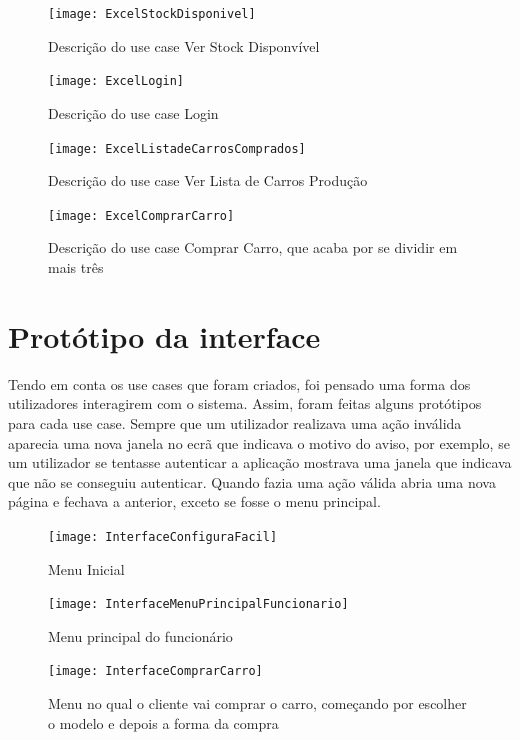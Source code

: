 \documentclass[10pt, a4paper]{report}
\begin{document}
\begin{figure}[!htb]
\centering
\texttt{[image: ExcelStockDisponivel]}
\caption{Descrição do use case Ver Stock Disponvível}
\label{EVSD}
\end{figure}

\begin{figure}[!htb]
\centering
\texttt{[image: ExcelLogin]}
\caption{Descrição do use case Login}
\label{EL}
\end{figure}

\begin{figure}[!htb]
\centering
\texttt{[image: ExcelListadeCarrosComprados]}
\caption{Descrição do use case Ver Lista de Carros Produção}
\label{EVCP}
\end{figure}

\begin{figure}[!htb]
\centering
\texttt{[image: ExcelComprarCarro]}
\caption{Descrição do use case Comprar Carro, que acaba por se dividir em mais três}
\label{ECC}
\end{figure}


\newpage
\section{Protótipo da interface}
Tendo em conta os use cases que foram criados, foi pensado uma forma dos utilizadores interagirem com o sistema. Assim, foram feitas alguns protótipos para cada use case. Sempre que um utilizador realizava uma ação inválida aparecia uma nova janela no ecrã que indicava o motivo do aviso, por exemplo, se um utilizador se tentasse autenticar a aplicação mostrava uma janela que indicava que não se conseguiu autenticar. Quando fazia uma ação válida abria uma nova página e fechava a anterior, exceto se fosse o menu principal.

\begin{figure}[!htb]
\centering
\texttt{[image: InterfaceConfiguraFacil]}
\caption{Menu Inicial}
\label{Menu I}
\end{figure}

\begin{figure}[!htb]
\centering
\texttt{[image: InterfaceMenuPrincipalFuncionario]}
\caption{Menu principal do funcionário}
\label{Menu PF}
\end{figure}

\begin{figure}[!htb]
\centering
\texttt{[image: InterfaceComprarCarro]}
\caption{Menu no qual o cliente vai comprar o carro, começando por escolher o modelo e depois a forma da compra}
\label{Menu CC}
\end{figure}
\end{document}
